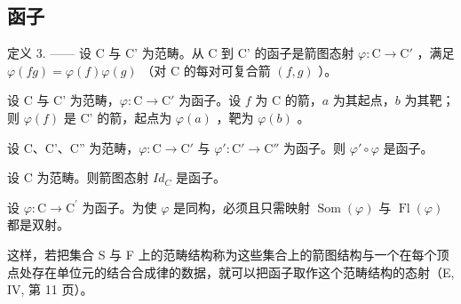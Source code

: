 \subsection{函子}

定义 3. —— 设 C 与 C' 为范畴。从 C 到 C' 的函子是箭图态射 \(\varphi\colon\mathrm{C}\to\mathrm{C}'\) ，满足 \(\varphi(fg)=\varphi(f)\varphi(g)\) （对 C 的每对可复合箭 \((f,g)\) ）。

设 C 与 C' 为范畴，\(\varphi\colon\mathrm{C}\to\mathrm{C}'\) 为函子。设 \(f\) 为 C 的箭，\(a\) 为其起点，\(b\) 为其靶；则 \(\varphi(f)\) 是 C' 的箭，起点为 \(\varphi(a)\) ，靶为 \(\varphi(b)\) 。

设 C、C'、C'' 为范畴，\(\varphi\colon\mathrm{C}\to\mathrm{C}'\) 与 \(\varphi'\colon\mathrm{C}'\to\mathrm{C}''\) 为函子。则 \(\varphi'\circ\varphi\) 是函子。

设 C 为范畴。则箭图态射 \(Id_{C}\) 是函子。

设 \(\varphi\colon\mathrm{C}\to\mathrm{C}^{\prime}\) 为函子。为使 \(\varphi\) 是同构，必须且只需映射 \(\operatorname{Som}(\varphi)\) 与 \(\operatorname{Fl}(\varphi)\) 都是双射。

这样，若把集合 S 与 F 上的范畴结构称为这些集合上的箭图结构与一个在每个顶点处存在单位元的结合合成律的数据，就可以把函子取作这个范畴结构的态射（E, IV, 第 11 页）。

